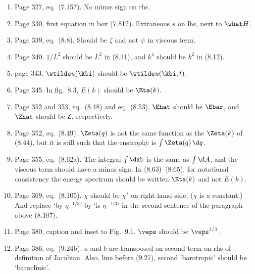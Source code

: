 \documentclass[10pt]{article}
\newcommand{\eq}{eq.\ } \newcommand{\Eq}{Eq.\ }
\begin{document}
\begin{enumerate}

\item Page 327, \eq (7.157). No minus sign on rhs.

\item Page 330, first equation in box (7.812). Extraneous $s$ on lhs, next to $\what H$.

\item Page 339, \eq (8.8). Should be $\zeta$ and not $\psi$ in viscous term. 


\item Page 340. $1/L^2$ should be $L^2$ in (8.11), and $k^4$ should be $k^2$ in (8.12).

\item page 343. $\wtilde u(\kbi)$ should be $\wtilde u(\kbi,t)$. 

\item Page 345. In fig.\ 8.3, $E(k)$ should be $\Eta(k)$.

\item Page 352 and 353, \eq (8.48) and \eq (8.53). $\Ehat$ should be $\Ebar$, and $\Zhat$ should be $\Zbar$, respectively.

\item Page 352, \eq (8.49).  $\Zeta(q)$ is not the same function as the $\Zeta(k)$ of (8.44), but it is still such that the enstrophy is $\int \Zeta(q) \, \d q$. 

\item Page 355, \eq (8.62a). The integral $\int \dxb$ is the same as $\int \d A$, and the viscous term should have a minus sign. In (8.63)--(8.65), for notational consistency the energy spectrum should be written $\Eta(k)$ and not $E(k)$.

\item Page 369, \eq (8.105). $\chi$ should be $\chi'$ on right-hand side. ($\chi$ is a constant.) And replace `by $\eta^{-1/3}$' by `is $\eta^{-1/3}$' in
the second sentence of the paragraph above (8.107). 

\item Page 380, caption and inset to Fig.\ 9.1. $\veps$ should be $\veps^{1/3}$. 

\item Page 386, \eq (9.24b). $a$ and $b$ are transposed on second term on rhs of definition of Jacobian. Also, line before (9.27), second `barotropic' should be `baroclinic'.


\end{enumerate}
\end{document}
